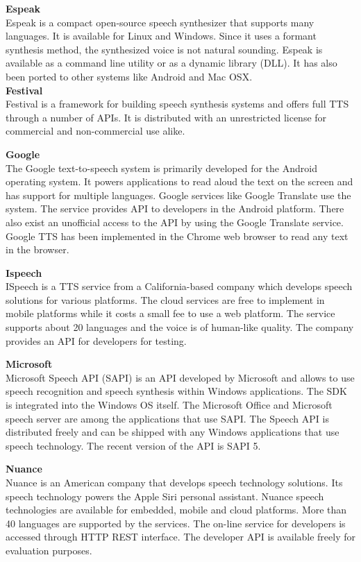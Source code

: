 \documentclass[11pt,a4paper,oneside,article]{memoir}
\begin{document}
\textbf{Espeak}\\
Espeak is a compact open-source speech synthesizer that supports many languages. It is available for Linux and Windows. Since it uses a formant synthesis method, the synthesized voice is not natural sounding. Espeak is available as a command line utility or as a dynamic library (DLL). It has also been ported to other systems like Android and Mac OSX. \cite{espeak}\\

\textbf{Festival} \\
Festival is a framework for building speech synthesis systems and offers full TTS through a number of APIs. It is distributed with an unrestricted license for commercial and non-commercial use alike. \cite{festival}

\textbf{Google}\\
The Google text-to-speech system is primarily developed for the Android operating system. It powers applications to read aloud the text on the screen and has support for multiple languages. Google services like Google Translate use the system. The service provides API to developers in the Android platform. There also exist an unofficial access to the API by using the Google Translate service. Google TTS has been implemented in the Chrome web browser to read any text in the browser. \cite{wiki:google-text-to-speech}

\textbf{Ispeech}\\
ISpeech is a TTS service from a California-based company which develops speech solutions for various platforms. The cloud services are free to implement in mobile platforms while it costs a small fee to use a web platform. The service supports about 20 languages and the voice is of human-like quality. The company provides an API for developers for testing. \cite{ispeech}

\textbf{Microsoft}\\
Microsoft Speech API (SAPI) is an API developed by Microsoft and allows to use speech recognition and speech synthesis within Windows applications. The SDK is integrated into the Windows OS itself. The Microsoft Office and Microsoft speech server are among the applications that use SAPI. The Speech API is distributed freely and can be shipped with any Windows applications that use speech technology. The recent version of the API is SAPI 5. \cite{microsoft}

\textbf{Nuance}\\
Nuance is an American company that develops speech technology solutions. Its speech technology powers the Apple Siri personal assistant.  Nuance speech technologies are available for embedded, mobile and cloud platforms. More than 40 languages are supported by the services. The on-line service for developers is accessed through HTTP REST interface. The developer API is available freely for evaluation purposes. \cite{nuance}
\end{document}
